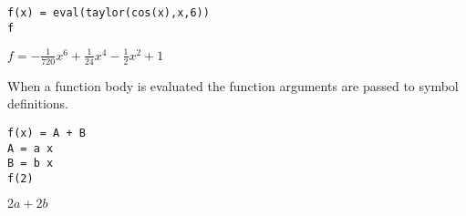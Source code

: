 \begin{Verbatim}[formatcom=\color{blue}]
f(x) = eval(taylor(cos(x),x,6))
f
\end{Verbatim}

$\displaystyle f=-\frac{1}{720}x^6+\frac{1}{24}x^4-\frac{1}{2}x^2+1$

When a function body is evaluated the function arguments
are passed to symbol definitions.

\begin{Verbatim}[formatcom=\color{blue}]
f(x) = A + B
A = a x
B = b x
f(2)
\end{Verbatim}

$\displaystyle 2a+2b$

